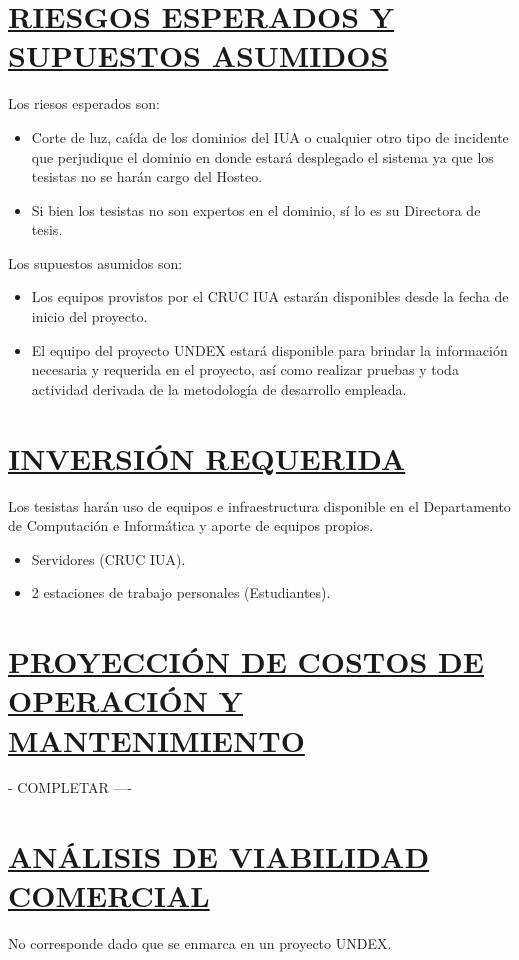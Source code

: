 \section*{\underline{RIESGOS ESPERADOS Y SUPUESTOS ASUMIDOS}}
Los riesos esperados son:
\begin{itemize}
	\item Corte de luz, caída de los dominios del IUA o cualquier otro tipo de incidente que perjudique el dominio en donde estará desplegado el sistema ya que los tesistas no se harán cargo del Hosteo.
	\item Si bien los tesistas no son expertos en el dominio, sí lo es su Directora de tesis.\\
\end{itemize}

Los supuestos asumidos son:
\begin{itemize}
	\item Los equipos provistos por el CRUC IUA estarán disponibles desde la fecha de inicio del proyecto.
	\item El equipo del proyecto UNDEX estará disponible para brindar la información necesaria y requerida en el proyecto, así como realizar pruebas y toda actividad derivada de la metodología de desarrollo empleada.\\
\end{itemize}


\section*{\underline{INVERSIÓN REQUERIDA}}
Los tesistas harán uso de equipos e infraestructura disponible en el Departamento de Computación e Informática y aporte de equipos propios.
\begin{itemize}
	\item Servidores (CRUC IUA).
	\item 2 estaciones de trabajo personales (Estudiantes).\\
\end{itemize}

\section*{\underline{PROYECCIÓN DE COSTOS DE OPERACIÓN Y MANTENIMIENTO}}
- COMPLETAR ----


\section*{\underline{ANÁLISIS DE VIABILIDAD COMERCIAL}}
No corresponde dado que se enmarca en un proyecto UNDEX.


